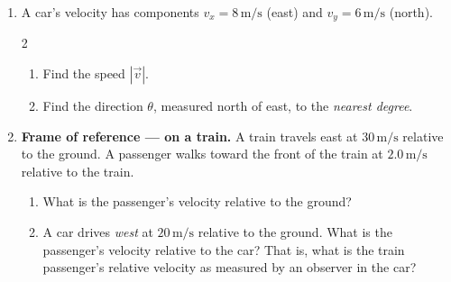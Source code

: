 \documentclass[12pt, twoside]{article}
\begin{document}
\begin{enumerate}
\newpage

\item A car's velocity has components $v_x = 8\,\text{m/s}$ (east) and $v_y = 6\,\text{m/s}$ (north).\vspace{0.25cm}
\begin{multicols}{2}
  \begin{enumerate}[itemsep=4cm]
    \item Find the speed $|\vec{v}|$.
    \item Find the direction $\theta$, measured north of east, to the \emph{nearest degree}.\vspace{4cm}
  \end{enumerate}
  \begin{flushright}
  \end{flushright}
\end{multicols}

\vspace{4cm}

\item \textbf{Frame of reference --- on a train.} A train travels east at $30\,\text{m/s}$ relative to the ground. A passenger walks toward the front of the train at $2.0\,\text{m/s}$ relative to the train.
  \begin{enumerate}[itemsep=4cm]
    \item What is the passenger's velocity relative to the ground?
    \item A car drives \emph{west} at $20\,\text{m/s}$ relative to the ground. What is the passenger's velocity relative to the car? That is, what is the train passenger's relative velocity as measured by an observer in the car?
    \vspace{2cm}
  \end{enumerate}

\newpage


\end{enumerate}
\end{document}
